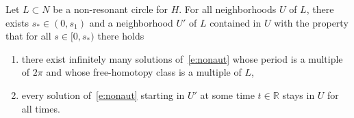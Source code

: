 \documentclass[AHL,Unicode,longabstracts,published]{cedram}
\newcommand{\R}{\mathbb{R}}
\begin{document}
\begin{theo}\label{t:Moser}
Let $L\subset N$ be a non-resonant circle for $H$. For all neighborhoods $U$ of $L$, there exists $s_*\in(0,s_1)$ and a neighborhood $U'$ of $L$ contained in $U$ with the property that for all $s\in[0,s_*)$ there holds
\begin{enumerate}
\item\label{theo3.1.1} there exist infinitely many solutions of~\eqref{e:nonaut} whose period is a multiple of $2\pi$ and whose free-homotopy class is a multiple of $L$,
\item\label{theo3.1.2} every solution of~\eqref{e:nonaut} starting in $U'$ at some time $t\in\R$ stays in $U$ for all times.
\end{enumerate}
\end{theo}
\end{document}
